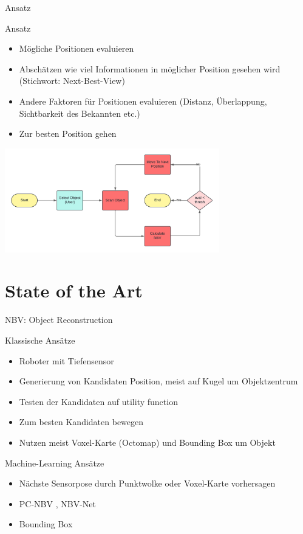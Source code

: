 \documentclass{beamer}
\begin{document}
\begin{frame}{Ansatz}
	\begin{block}{Ansatz}
		\begin{itemize}
			\item Mögliche Positionen evaluieren
			\item Abschätzen wie viel Informationen in möglicher Position gesehen wird (Stichwort: Next-Best-View)
			\item Andere Faktoren für Positionen evaluieren (Distanz, Überlappung, Sichtbarkeit des Bekannten etc.)
			\item Zur besten Position gehen
		\end{itemize}
	\end{block}
	\begin{center}
		\includegraphics[width=0.7\textwidth]{Graphics/flow_chart_v2.png}
	\end{center}
\end{frame}

\section{State of the Art}
\begin{frame}{NBV: Object Reconstruction}
	\begin{block}{Klassische Ansätze}
		\begin{itemize}
			\item Roboter mit Tiefensensor
			\item Generierung von Kandidaten Position, meist auf Kugel um Objektzentrum
			\item Testen der Kandidaten auf utility function
			\item Zum besten Kandidaten bewegen
			\item Nutzen meist Voxel-Karte (Octomap) und Bounding Box um Objekt
		\end{itemize}
		\cite{zeng_view_2020}
	\end{block}
	\begin{exampleblock}{Machine-Learning Ansätze}
		\begin{itemize}
			\item Nächste Sensorpose durch Punktwolke oder Voxel-Karte vorhersagen
			\item PC-NBV \cite{zeng_pc-nbv_2020}, NBV-Net \cite{mendoza_supervised_2020}
			\item Bounding Box
		\end{itemize}
	\end{exampleblock}
\end{frame}
\end{document}
